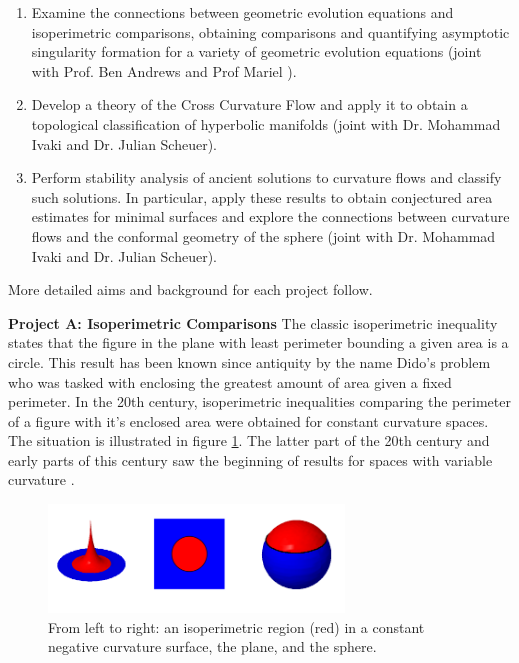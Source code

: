 \documentclass[12pt]{amsart}
\begin{document}
\begin{enumerate}[label=\textbf{(\Alph*)}]
\item Examine the connections between geometric evolution equations and isoperimetric comparisons, obtaining comparisons and quantifying asymptotic singularity formation for a variety of geometric evolution equations (joint with Prof. Ben Andrews and Prof Mariel \saez{}).
\item Develop a theory of the Cross Curvature Flow and apply it to obtain a topological classification of hyperbolic manifolds (joint with Dr. Mohammad Ivaki and Dr. Julian Scheuer).
\item Perform stability analysis of ancient solutions to curvature flows and classify such solutions. In particular, apply these results to obtain conjectured area estimates for minimal surfaces and explore the connections between curvature flows and the conformal geometry of the sphere (joint with Dr. Mohammad Ivaki and Dr. Julian Scheuer).
\end{enumerate}

\noindent More detailed aims and background for each project follow.

\noindent\textbf{Project A: Isoperimetric Comparisons}
\label{sec-2-1}
The classic isoperimetric inequality states that the figure in the plane with least perimeter bounding a given area is a circle. This result has been known since antiquity by the name Dido's problem who was tasked with enclosing the greatest amount of area given a fixed perimeter. In the 20th century, isoperimetric inequalities comparing the perimeter of a figure with it's enclosed area were obtained for constant curvature spaces. The situation is illustrated in figure \ref{fg:const_curve_isoperimetric}. The latter part of the 20th century and early parts of this century saw the beginning of results for spaces with variable curvature \cite{MR1699261,MR1661278,MR1883725}.

\begin{figure}[htb]
\centering
\includegraphics[width=0.7\textwidth]{img/const_curve.png}
\caption{\label{fg:const_curve_isoperimetric}From left to right: an isoperimetric region (red) in a constant negative curvature surface, the plane, and the sphere.}
\end{figure}
\end{document}
